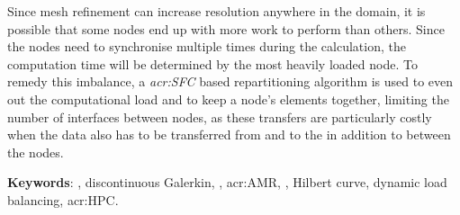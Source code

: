Since mesh refinement can increase resolution anywhere in the domain, it is possible that some nodes
end up with more work to perform than others. Since the nodes need to synchronise multiple times
during the calculation, the computation time will be determined by the most heavily loaded node. To
remedy this imbalance, a \textit{\acrfull{acr:SFC}} based repartitioning algorithm is used to even
out the computational load and to keep a node's elements together, limiting the number of interfaces
between nodes, as these transfers are particularly costly when the data also has to be  transferred
from and to the  in addition to between the nodes.


\textbf{Keywords}: , discontinuous Galerkin, , \acrlong{acr:AMR}, , Hilbert curve, dynamic load balancing, \acrlong{acr:HPC}.
